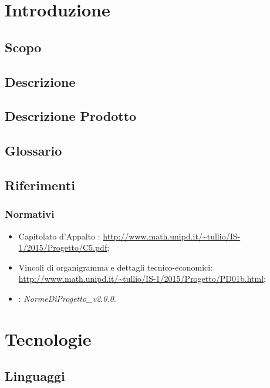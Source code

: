 \documentclass[12pt,a4paper]{article}
\begin{document}
\newpage
\tableofcontents
\newpage
\listoftables
\listoffigures
\newpage

\section{Introduzione}

\subsection{Scopo}


\subsection{Descrizione}


\subsection{Descrizione Prodotto}
\descrizioneProdotto

\subsection{Glossario}\label{glossario}
\glossarioPrint

\subsection{Riferimenti}\label{riferimenti}
\subsubsection{Normativi}
\begin{itemize}
	\item Capitolato d’Appalto \prjL: \url{http://www.math.unipd.it/~tullio/IS-1/2015/Progetto/C5.pdf};
	\item Vincoli di organigramma e dettagli tecnico-economici: \url{http://www.math.unipd.it/~tullio/IS-1/2015/Progetto/PD01b.html};
	\item \NdP: \textit{NormeDiProgetto\_v2.0.0}. 
\end{itemize}

\newpage

\section{Tecnologie}
\TODO{}

\subsection{Linguaggi}
\end{document}
